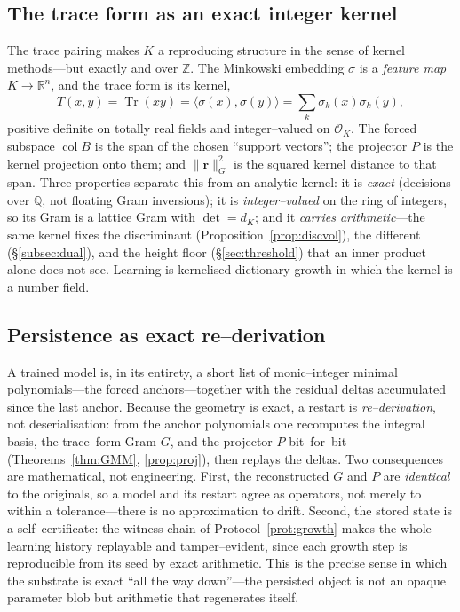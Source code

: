 \documentclass[11pt]{article}
\theoremstyle{plain}
\theoremstyle{definition}
\theoremstyle{remark}
\newcommand{\Q}{\mathbb{Q}}
\newcommand{\Z}{\mathbb{Z}}
\newcommand{\R}{\mathbb{R}}
\newcommand{\K}{K}
\newcommand{\OK}{\mathcal{O}_K}
\newcommand{\Tr}{\operatorname{Tr}}
\newcommand{\rr}{\mathbf{r}}
\newcommand{\GG}{G}
\newcommand{\BB}{B}
\DeclareMathOperator{\col}{col}
\begin{document}
\subsection{The trace form as an exact integer kernel}\label{subsec:kernel}
The trace pairing makes $\K$ a reproducing structure in the sense of kernel methods---but exactly and over
$\Z$. The Minkowski embedding $\sigma$ is a \emph{feature map} $\K\to\R^n$, and the trace form is its kernel,
\[
  T(x,y)=\Tr(xy)=\langle\sigma(x),\sigma(y)\rangle=\sum_k\sigma_k(x)\sigma_k(y),
\]
positive definite on totally real fields and integer--valued on $\OK$. The forced subspace $\col\BB$ is the
span of the chosen ``support vectors''; the projector $P$ is the kernel projection onto them; and
$\lVert\rr\rVert_{\GG}^2$ is the squared kernel distance to that span. Three properties separate this from an
analytic kernel: it is \emph{exact} (decisions over $\Q$, not floating Gram inversions); it is
\emph{integer--valued} on the ring of integers, so its Gram is a lattice Gram with $\det=d_\K$; and it
\emph{carries arithmetic}---the same kernel fixes the discriminant (Proposition~\ref{prop:discvol}), the
different (\S\ref{subsec:dual}), and the height floor (\S\ref{sec:threshold}) that an inner product alone does
not see. Learning is kernelised dictionary growth in which the kernel is a number field.

\subsection{Persistence as exact re--derivation}\label{subsec:persist}
A trained model is, in its entirety, a short list of monic--integer minimal polynomials---the forced
anchors---together with the residual deltas accumulated since the last anchor. Because the geometry is exact,
a restart is \emph{re--derivation}, not deserialisation: from the anchor polynomials one recomputes the
integral basis, the trace--form Gram $\GG$, and the projector $P$ bit--for--bit
(Theorems~\ref{thm:GMM}, \ref{prop:proj}), then replays the deltas. Two consequences are mathematical, not
engineering. First, the reconstructed $\GG$ and $P$ are \emph{identical} to the originals, so a model and its
restart agree as operators, not merely to within a tolerance---there is no approximation to drift. Second,
the stored state is a self--certificate: the witness chain of Protocol~\ref{prot:growth} makes the whole
learning history replayable and tamper--evident, since each growth step is reproducible from its seed by
exact arithmetic. This is the precise sense in which the substrate is exact ``all the way down''---the
persisted object is not an opaque parameter blob but arithmetic that regenerates itself.
\end{document}
